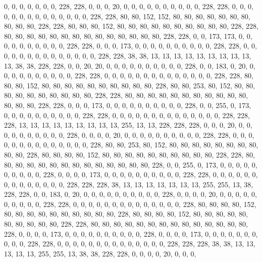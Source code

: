 {	0,   0,   0,   0,   0,   0,   0,   228, 228, 0,   0,   0,   20,  0,   0,   0,   0,   0,   0,   0,   0,   0,   0,   228, 228, 0,   0,   0,   0,   0,   0,   0,   0,   0,   0,   0,   0,   0,   0,   228, 228, 80,  80,  152, 152, 80,  80,  80,  80,  80,  80,  80,  80,  80,  80,  228, 228, 80,  80,  80,  152, 80,  80,  80,  80,  80,  80,  80,  80,  80,  80,  228, 228, 80,  80,  80,  80,  80,  80,  80,  80,  80,  80,  80,  80,  80,  80,  228, 228, 0,   0,   173, 173, 0,   0,   0,   0,   0,   0,   0,   0,   0,   0,   228, 228, 0,   0,   0,   173, 0,   0,   0,   0,   0,   0,   0,   0,   0,   0,   228, 228, 0,   0,   0,   0,   0,   0,   0,   0,   0,   0,   0,   0,   0,   0,   228, 228, 38,  38,  13,  13,  13,  13,  13,  13,  13,  13,  13,  13,  38,  38,  228, 228, 0,   0,   20,  20,  0,   0,   0,   
	0,   0,   0,   0,   0,   0,   0,   228, 0,   0,   183, 0,   20,  0,   0,   0,   0,   0,   0,   0,   0,   0,   0,   228, 228, 0,   0,   0,   0,   0,   0,   0,   0,   0,   0,   0,   0,   0,   0,   228, 228, 80,  80,  80,  152, 80,  80,  80,  80,  80,  80,  80,  80,  80,  80,  228, 80,  80,  253, 80,  152, 80,  80,  80,  80,  80,  80,  80,  80,  80,  80,  228, 228, 80,  80,  80,  80,  80,  80,  80,  80,  80,  80,  80,  80,  80,  80,  228, 228, 0,   0,   0,   173, 0,   0,   0,   0,   0,   0,   0,   0,   0,   0,   228, 0,   0,   255, 0,   173, 0,   0,   0,   0,   0,   0,   0,   0,   0,   0,   228, 228, 0,   0,   0,   0,   0,   0,   0,   0,   0,   0,   0,   0,   0,   0,   228, 228, 228, 13,  13,  13,  13,  13,  13,  13,  13,  13,  255, 13,  13,  228, 228, 228, 0,   0,   0,   20,  0,   0,   0,   
	0,   0,   0,   0,   0,   0,   0,   228, 0,   0,   0,   0,   20,  0,   0,   0,   0,   0,   0,   0,   0,   0,   0,   228, 228, 0,   0,   0,   0,   0,   0,   0,   0,   0,   0,   0,   0,   0,   0,   228, 80,  80,  253, 80,  152, 80,  80,  80,  80,  80,  80,  80,  80,  80,  80,  228, 80,  80,  80,  80,  152, 80,  80,  80,  80,  80,  80,  80,  80,  80,  80,  228, 228, 80,  80,  80,  80,  80,  80,  80,  80,  80,  80,  80,  80,  80,  80,  228, 0,   0,   255, 0,   173, 0,   0,   0,   0,   0,   0,   0,   0,   0,   0,   228, 0,   0,   0,   0,   173, 0,   0,   0,   0,   0,   0,   0,   0,   0,   0,   228, 228, 0,   0,   0,   0,   0,   0,   0,   0,   0,   0,   0,   0,   0,   0,   228, 228, 228, 38,  13,  13,  13,  13,  13,  13,  13,  255, 255, 13,  38,  228, 228, 0,   0,   183, 0,   20,  0,   0,   0,   
	0,   0,   0,   0,   0,   0,   0,   228, 0,   0,   0,   0,   20,  0,   0,   0,   0,   0,   0,   0,   0,   0,   0,   228, 228, 0,   0,   0,   0,   0,   0,   0,   0,   0,   0,   0,   0,   0,   0,   228, 80,  80,  80,  80,  152, 80,  80,  80,  80,  80,  80,  80,  80,  80,  80,  228, 80,  80,  80,  80,  152, 80,  80,  80,  80,  80,  80,  80,  80,  80,  80,  228, 228, 80,  80,  80,  80,  80,  80,  80,  80,  80,  80,  80,  80,  80,  80,  228, 0,   0,   0,   0,   173, 0,   0,   0,   0,   0,   0,   0,   0,   0,   0,   228, 0,   0,   0,   0,   173, 0,   0,   0,   0,   0,   0,   0,   0,   0,   0,   228, 228, 0,   0,   0,   0,   0,   0,   0,   0,   0,   0,   0,   0,   0,   0,   228, 228, 228, 38,  38,  13,  13,  13,  13,  13,  255, 255, 13,  38,  38,  228, 228, 0,   0,   0,   0,   20,  0,   0,   0,   
}

